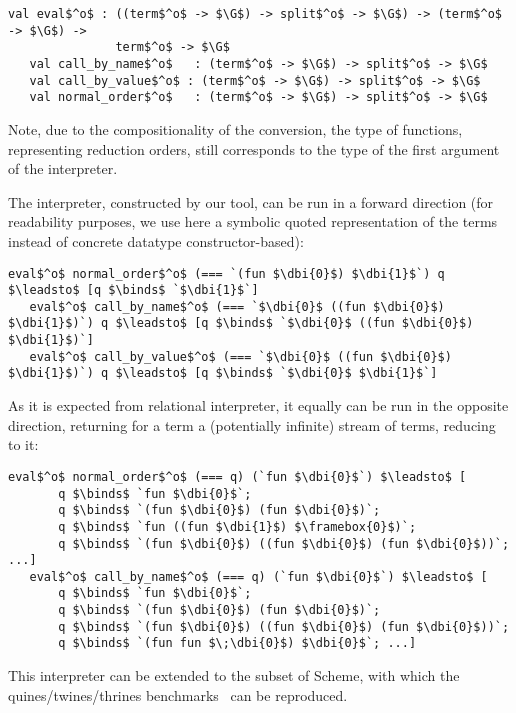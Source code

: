 \begin{lstlisting}[basicstyle=\small]
   val eval$^o$ : ((term$^o$ -> $\G$) -> split$^o$ -> $\G$) -> (term$^o$ -> $\G$) -> 
               term$^o$ -> $\G$
   val call_by_name$^o$   : (term$^o$ -> $\G$) -> split$^o$ -> $\G$
   val call_by_value$^o$ : (term$^o$ -> $\G$) -> split$^o$ -> $\G$
   val normal_order$^o$   : (term$^o$ -> $\G$) -> split$^o$ -> $\G$
\end{lstlisting}

Note, due to the compositionality of the conversion, the type of functions, representing reduction orders, still corresponds to the type of the first 
argument of the interpreter.

The interpreter, constructed by our tool, can be run in a forward direction (for readability purposes, we use here a symbolic quoted representation of
the terms instead of concrete datatype constructor-based):

\begin{lstlisting}[basicstyle=\small]
   eval$^o$ normal_order$^o$ (=== `(fun $\dbi{0}$) $\dbi{1}$`) q $\leadsto$ [q $\binds$ `$\dbi{1}$`]   
   eval$^o$ call_by_name$^o$ (=== `$\dbi{0}$ ((fun $\dbi{0}$) $\dbi{1}$)`) q $\leadsto$ [q $\binds$ `$\dbi{0}$ ((fun $\dbi{0}$) $\dbi{1}$)`]   
   eval$^o$ call_by_value$^o$ (=== `$\dbi{0}$ ((fun $\dbi{0}$) $\dbi{1}$)`) q $\leadsto$ [q $\binds$ `$\dbi{0}$ $\dbi{1}$`] 
\end{lstlisting}

As it is expected from relational interpreter, it equally can be run in the opposite direction, returning for a term a (potentially infinite) stream
of terms, reducing to it:

\begin{lstlisting}[basicstyle=\small]
   eval$^o$ normal_order$^o$ (=== q) (`fun $\dbi{0}$`) $\leadsto$ [
       q $\binds$ `fun $\dbi{0}$`; 
       q $\binds$ `(fun $\dbi{0}$) (fun $\dbi{0}$)`; 
       q $\binds$ `fun ((fun $\dbi{1}$) $\framebox{0}$)`; 
       q $\binds$ `(fun $\dbi{0}$) ((fun $\dbi{0}$) (fun $\dbi{0}$))`; ...] 
   eval$^o$ call_by_name$^o$ (=== q) (`fun $\dbi{0}$`) $\leadsto$ [
       q $\binds$ `fun $\dbi{0}$`; 
       q $\binds$ `(fun $\dbi{0}$) (fun $\dbi{0}$)`; 
       q $\binds$ `(fun $\dbi{0}$) ((fun $\dbi{0}$) (fun $\dbi{0}$))`; 
       q $\binds$ `(fun fun $\;\dbi{0}$) $\dbi{0}$`; ...] 
\end{lstlisting}

This interpreter can be extended to the subset of Scheme, with which the quines/twines/thrines benchmarks~\cite{Untagged} can be
reproduced.

